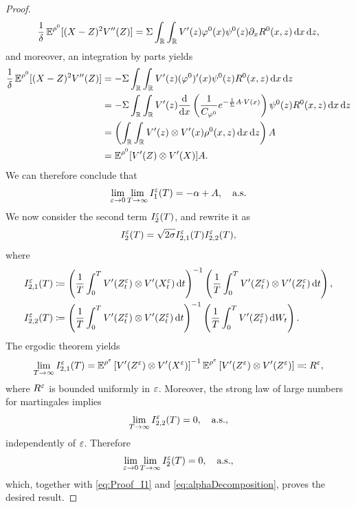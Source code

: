 \documentclass[10pt]{article}
\begin{document}
\begin{proof}
\begin{equation}\label{eq:final_result}
	\frac{1}{\delta} \operatorname{\mathbb{E}}^{\rho^0}[(X - Z)^2 V''(Z)] = \Sigma \int_{\mathbb{R}} \int_{\mathbb{R}} V'(z) \varphi^0(x) \psi^0(z) \partial_x R^0(x,z) \,\mathrm{d} x \,\mathrm{d} z,
\end{equation}
and moreover, an integration by parts yields
\begin{equation}
\begin{aligned}
	\frac{1}{\delta} \operatorname{\mathbb{E}}^{\rho^0}[(X - Z)^2 V''(Z)] &= -\Sigma \int_{\mathbb{R}} \int_{\mathbb{R}} V'(z) (\varphi^0)'(x) \psi^0(z) R^0(x,z) \,\mathrm{d} x \,\mathrm{d} z\\
	&= -\Sigma \int_{\mathbb{R}} \int_{\mathbb{R}} V'(z) \frac{\mathrm{d}}{\mathrm{d} x} \left ( \frac{1}{C_{\varphi^0}} e^{-\frac{1}{\Sigma} A\cdot V(x)} \right ) \psi^0(z) R^0(x,z) \,\mathrm{d} x \,\mathrm{d} z \\
	&= \left(\int_{\mathbb{R}} \int_{\mathbb{R}} V'(z) \otimes V'(x) \rho^0(x,z) \,\mathrm{d} x \,\mathrm{d} z\right)A\\
	&=  \operatorname{\mathbb{E}}^{\rho^0} [ V'(Z) \otimes V'(X) ]A.
\end{aligned}
\end{equation}
We can therefore conclude that
\begin{equation}\label{eq:Proof_I1}
\lim_{\varepsilon \to 0} \lim_{T \to \infty} I_1^\varepsilon(T) = -\alpha + A, \quad \text{a.s.}
\end{equation}
We now consider the second term $I_2^\varepsilon(T)$, and rewrite it as
\begin{equation}
	I^\varepsilon_2(T) = \sqrt{2\sigma} I_{2,1}^\varepsilon(T)  I_{2,2}^\varepsilon(T),
\end{equation}
where
\begin{equation}
\begin{aligned}
	I_{2,1}^\varepsilon(T) &\coloneqq \left(\frac{1}{T} \int_0^T V'(Z^\varepsilon_t) \otimes V'(X^\varepsilon_t) \,\mathrm{d} t\right)^{-1}\left(\frac{1}{T} \int_0^T V'(Z^\varepsilon_t) \otimes V'(Z^\varepsilon_t) \,\mathrm{d} t\right),\\
	I_{2,2}^\varepsilon(T) &\coloneqq \left(\frac{1}{T} \int_0^T V'(Z^\varepsilon_t) \otimes V'(Z^\varepsilon_t) \,\mathrm{d} t\right)^{-1} \left(\frac1T \int_0^T V'(Z^\varepsilon_t) \,\mathrm{d} W_t\right).
\end{aligned}
\end{equation}
The ergodic theorem yields
\begin{equation}
	\lim_{T \to \infty} I_{2,1}^\varepsilon(T) = \operatorname{\mathbb{E}}^{\rho^\varepsilon}\left[V'(Z^\varepsilon) \otimes V'(X^\varepsilon)\right]^{-1}\operatorname{\mathbb{E}}^{\rho^\varepsilon}\left[V'(Z^\varepsilon) \otimes V'(Z^\varepsilon)\right] \eqqcolon R^\varepsilon,
\end{equation}
where $R^\varepsilon$ is bounded uniformly in $\varepsilon$. Moreover, the strong law of large numbers for martingales implies
\begin{equation}
	\lim_{T \to \infty} I_{2,2}^\varepsilon(T) = 0, \quad \text{a.s.},
\end{equation}
independently of $\varepsilon$. Therefore
\begin{equation}
	\lim_{\varepsilon \to 0}\lim_{T \to \infty} I_2^\varepsilon(T) = 0, \quad \text{a.s.},
\end{equation}
which, together with \eqref{eq:Proof_I1} and \eqref{eq:alphaDecomposition}, proves the desired result.
\end{proof}
\end{document}
